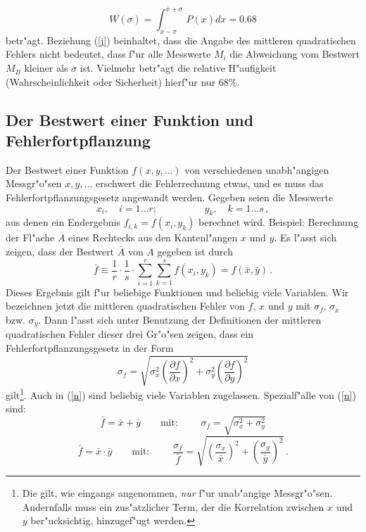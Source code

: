 \begin{equation} \label{j}
  W(\sigma) = \int_{\bar{x}-\sigma}^{\bar{x}+\sigma} \, P(x) dx =
  0.68
\end{equation}
%
betr"agt. Beziehung (\ref{j}) beinhaltet, dass die Angabe des
mittleren quadratischen Fehlers nicht bedeutet, dass f"ur alle
Messwerte $M_i$ die Abweichung vom Bestwert $M_B$ kleiner als
$\sigma$ ist. Vielmehr betr"agt die relative H"aufigkeit
(Wahrscheinlichkeit oder Sicherheit) hierf"ur nur 68\%.


\subsection{Der Bestwert einer Funktion und Fehlerfortpflanzung}

Der Bestwert einer Funktion $f(x,y,...)$ von verschiedenen
unabh"angigen Messgr"o"sen $x,y,...$ erschwert die Fehlerrechnung
etwas, und es muss das
Fehlerfortpflanzungsgesetz
angewandt werden. Gegeben seien die Messwerte
%
\begin{equation} \label{l}
  x_{i},\quad i=1\ldots r; \hspace{2cm} y_{k},\quad k=1\ldots s \,
  ,
\end{equation}
%
aus denen ein Endergebnis $f_{i,k}=f(x_{i},y_{k})$ berechnet wird.
Beispiel: Berechnung der Fl"ache $A$ eines Rechtecks aus den
Kantenl"angen $x$ und $y$. Es l"asst sich zeigen, dass der Bestwert
$\bar A$ von $A$ gegeben ist durch
%
\begin{equation} \label{m}
 \bar f \equiv  \frac{1}{r} \cdot \frac{1}{s} \cdot
  \sum_{i=1}^{r} \sum_{k=1}^{s} f(x_{i},y_{k}) = f(\bar x, \bar y)
  \, .
\end{equation}
%
Dieses Ergebnis gilt f"ur beliebige Funktionen und beliebig viele
Variablen. Wir bezeichnen jetzt die mittleren quadratischen Fehler
von $f$, $x$ und $y$ mit $\sigma_f$, $\sigma_x$ bzw. $\sigma_y$.
Dann l"asst sich unter Benutzung der Definitionen der mittleren
quadratischen Fehler dieser drei Gr"o"sen zeigen, dass ein
Fehlerfortpflanzungsgesetz in der Form
%
\begin{equation} \label{n}
 \sigma_{f} =
   \sqrt{\sigma_{x}^{2} \left( \frac{\partial f}{\partial x} \right)^{2}
    +
         \sigma_{y}^{2} \left( \frac{\partial f}{\partial y} \right)^{2}
   }
\end{equation}
%
gilt\footnote{Die gilt, wie eingangs angenommen, {\it nur} f"ur unab"angige
Messgr"o"sen. Andernfalls muss ein zus"atzlicher Term, der die Korrelation
zwischen $x$ und $y$ ber"ucksichtig, hinzugef"ugt werden.}. 
Auch in (\ref{n}) sind beliebig viele Variablen zugelassen.
Spezialf"alle von (\ref{n}) sind:
%
\begin{equation} \label{o}
  \bar f = \bar x + \bar y \qquad \mbox{mit: } \qquad
  \sigma_{f} = \sqrt{\sigma_{x}^{2} + \sigma_{y}^{2}}
\end{equation}
%
\begin{equation} \label{q}
  \bar f = \bar x \cdot \bar y \qquad \mbox{mit: } \qquad
  \frac{\sigma_{f}}{\bar f}  = \sqrt{\left(\frac{\sigma_{x}}{\bar
 x}\right)^{2} + \left(\frac{\sigma_{y}}{\bar y}\right)^{2}} \, .
\end{equation}
%
%


